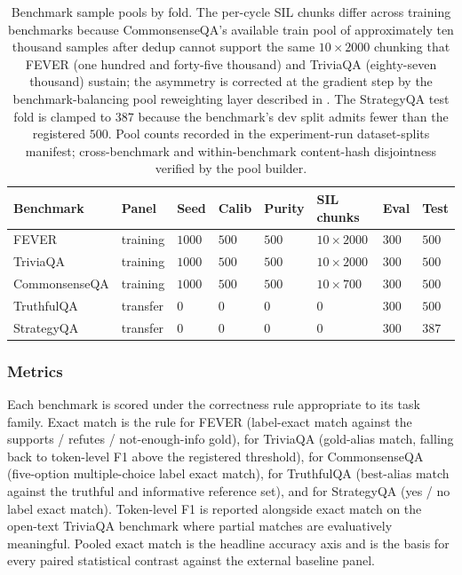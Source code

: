 \begin{table}[!htbp]
\centering
\small
\begin{tabular}{@{}p{2.6cm}p{1.5cm}p{1.0cm}p{1.0cm}p{1.0cm}p{2.0cm}p{1.0cm}p{1.0cm}@{}}
\toprule
\textbf{Benchmark} & \textbf{Panel} & \textbf{Seed} & \textbf{Calib} & \textbf{Purity} & \textbf{SIL chunks} & \textbf{Eval} & \textbf{Test} \\
\midrule
FEVER             & training & $1000$ & $500$ & $500$ & $10\times 2000$ & $300$ & $500$ \\
TriviaQA          & training & $1000$ & $500$ & $500$ & $10\times 2000$ & $300$ & $500$ \\
CommonsenseQA     & training & $1000$ & $500$ & $500$ & $10\times 700$  & $300$ & $500$ \\
TruthfulQA        & transfer & $0$    & $0$   & $0$   & $0$             & $300$ & $500$ \\
StrategyQA        & transfer & $0$    & $0$   & $0$   & $0$             & $300$ & $387$ \\
\bottomrule
\end{tabular}
\caption[Benchmark sample pools by fold]{Benchmark sample pools by fold. The per-cycle SIL chunks differ across training benchmarks because CommonsenseQA's available train pool of approximately ten thousand samples after dedup cannot support the same $10 \times 2000$ chunking that FEVER (one hundred and forty-five thousand) and TriviaQA (eighty-seven thousand) sustain; the asymmetry is corrected at the gradient step by the benchmark-balancing pool reweighting layer described in . The StrategyQA test fold is clamped to $387$ because the benchmark's dev split admits fewer than the registered $500$. Pool counts recorded in the experiment-run dataset-splits manifest; cross-benchmark and within-benchmark content-hash disjointness verified by the pool builder.}
\label{tab:benchmark-pools}
\end{table}

\subsubsection{Metrics}
\label{sec:setup-metrics}

Each benchmark is scored under the correctness rule appropriate to its task family. Exact match is the rule for FEVER (label-exact match against the supports / refutes / not-enough-info gold), for TriviaQA (gold-alias match, falling back to token-level F1 above the registered threshold), for CommonsenseQA (five-option multiple-choice label exact match), for TruthfulQA (best-alias match against the truthful and informative reference set), and for StrategyQA (yes / no label exact match). Token-level F1 is reported alongside exact match on the open-text TriviaQA benchmark where partial matches are evaluatively meaningful. Pooled exact match is the headline accuracy axis and is the basis for every paired statistical contrast against the external baseline panel.


